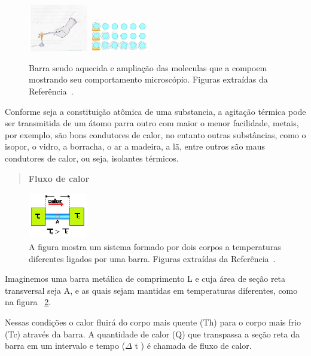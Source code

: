 \documentclass[a4wide]{report}
\begin{document}
\begin{figure}[h]
\centering
\includegraphics[width=0.23\textwidth]{barra_aquecida}
\includegraphics[width=0.23\textwidth]{moleculas}
\caption{Barra sendo aquecida e ampliação das moleculas que a compoem mostrando seu comportamento microscópio.
Figuras extraídas da Referência~\cite{Cur}.}
\label{barra_moleculas}
\end{figure}
	Conforme seja a constituição atômica de uma substancia, a agitação térmica pode ser 
transmitida de um átomo parra outro com maior o menor facilidade, metais, por exemplo, são bons 
condutores de calor, no entanto outras substâncias, como o isopor, o vidro, a borracha, o ar a 
madeira, a lã, entre outros são maus condutores de calor, ou seja, isolantes térmicos.
\begin{quote}

\centering

\bf Fluxo de calor

\end{quote}

\begin{figure}[h]
\centering
\includegraphics[width=0.23\textwidth]{fluxo}
\caption{A figura mostra um sistema formado por dois corpos a temperaturas diferentes ligados por uma barra.
Figuras extraídas da Referência~\cite{Cur}.}
\label{fluxxo}
\end{figure}

Imaginemos uma barra metálica de comprimento L e cuja área de seção reta transversal seja A, e as
quais sejam mantidas em temperaturas diferentes, como na figura ~\ref{fluxxo}.

Nessas condições o calor fluirá do corpo mais quente (Th) para o corpo mais frio (Tc) através da
barra. A quantidade de calor (Q) que transpassa a seção reta da barra em um intervalo e 
tempo ($\Delta$  t ) é chamada de fluxo de calor.
\end{document}

